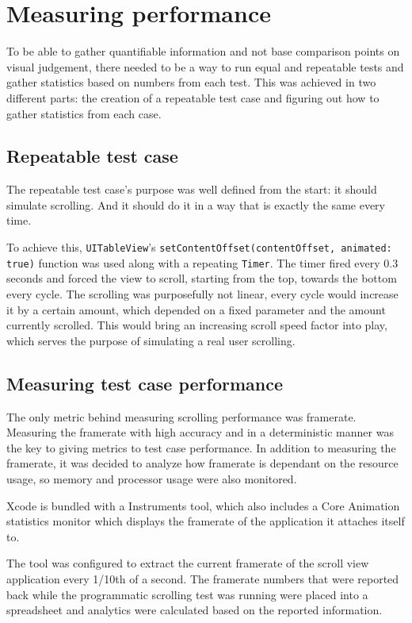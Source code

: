 \documentclass[a4paper,12pt]{article}
\begin{document}
\section{Measuring performance}
To be able to gather quantifiable information and not base comparison points on visual judgement, there needed to be a way to run equal and repeatable tests and gather statistics based on numbers from each test. This was achieved in two different parts: the creation of a repeatable test case and figuring out how to gather statistics from each case.

\subsection{Repeatable test case}
The repeatable test case's purpose was well defined from the start: it should simulate scrolling. And it should do it in a way that is exactly the same every time.

To achieve this, \texttt{UITableView}'s \texttt{setContentOffset(contentOffset, animated: true)} function was used along with a repeating \texttt{Timer}. The timer fired every 0.3 seconds and forced the view to scroll, starting from the top, towards the bottom every cycle. The scrolling was purposefully not linear, every cycle would increase it by a certain amount, which depended on a fixed parameter and the amount currently scrolled. This would bring an increasing scroll speed factor into play, which serves the purpose of simulating a real user scrolling.

\subsection{Measuring test case performance}
The only metric behind measuring scrolling performance was framerate. Measuring the framerate with high accuracy and in a deterministic manner was the key to giving metrics to test case performance. In addition to measuring the framerate, it was decided to analyze how framerate is dependant on the resource usage, so memory and processor usage were also monitored.

Xcode is bundled with a Instruments tool, which also includes a Core Animation statistics monitor which displays the framerate of the application it attaches itself to.

The tool was configured to extract the current framerate of the scroll view application every 1/10th of a second. The framerate numbers that were reported back while the programmatic scrolling test was running were placed into a spreadsheet and analytics were calculated based on the reported information.
\end{document}
